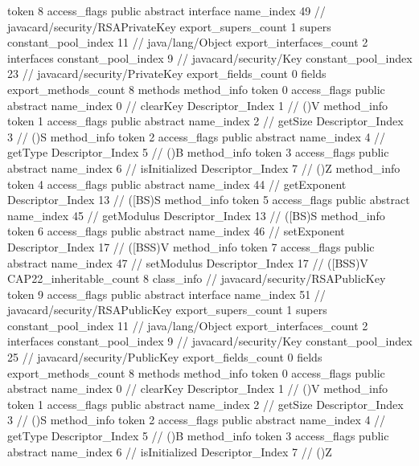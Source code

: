 {{{			token	8
			access_flags	public abstract interface
			name_index	49		// javacard/security/RSAPrivateKey
			export_supers_count	1
			supers {
				constant_pool_index	11		// java/lang/Object
			}
			export_interfaces_count	2
			interfaces {
				constant_pool_index	9		// javacard/security/Key
				constant_pool_index	23		// javacard/security/PrivateKey
			}
			export_fields_count	0
			fields {
			}
			export_methods_count	8
			methods {
				method_info {
					token	0
					access_flags	public abstract
					name_index	0		// clearKey
					Descriptor_Index	1		// ()V
				}
				method_info {
					token	1
					access_flags	public abstract
					name_index	2		// getSize
					Descriptor_Index	3		// ()S
				}
				method_info {
					token	2
					access_flags	public abstract
					name_index	4		// getType
					Descriptor_Index	5		// ()B
				}
				method_info {
					token	3
					access_flags	public abstract
					name_index	6		// isInitialized
					Descriptor_Index	7		// ()Z
				}
				method_info {
					token	4
					access_flags	public abstract
					name_index	44		// getExponent
					Descriptor_Index	13		// ([BS)S
				}
				method_info {
					token	5
					access_flags	public abstract
					name_index	45		// getModulus
					Descriptor_Index	13		// ([BS)S
				}
				method_info {
					token	6
					access_flags	public abstract
					name_index	46		// setExponent
					Descriptor_Index	17		// ([BSS)V
				}
				method_info {
					token	7
					access_flags	public abstract
					name_index	47		// setModulus
					Descriptor_Index	17		// ([BSS)V
				}
			}
			CAP22_inheritable_count	8
		}
		class_info {		// javacard/security/RSAPublicKey
			token	9
			access_flags	public abstract interface
			name_index	51		// javacard/security/RSAPublicKey
			export_supers_count	1
			supers {
				constant_pool_index	11		// java/lang/Object
			}
			export_interfaces_count	2
			interfaces {
				constant_pool_index	9		// javacard/security/Key
				constant_pool_index	25		// javacard/security/PublicKey
			}
			export_fields_count	0
			fields {
			}
			export_methods_count	8
			methods {
				method_info {
					token	0
					access_flags	public abstract
					name_index	0		// clearKey
					Descriptor_Index	1		// ()V
				}
				method_info {
					token	1
					access_flags	public abstract
					name_index	2		// getSize
					Descriptor_Index	3		// ()S
				}
				method_info {
					token	2
					access_flags	public abstract
					name_index	4		// getType
					Descriptor_Index	5		// ()B
				}
				method_info {
					token	3
					access_flags	public abstract
					name_index	6		// isInitialized
					Descriptor_Index	7		// ()Z
}}}}}
